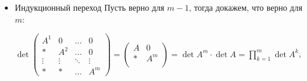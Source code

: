 \begin{enumerate}
\begin{itemize}
                    \(\det\begin{pmatrix}
                        B & 0       \\
                        * & E_{k_2} \\
                    \end{pmatrix} \underbracket{=}_{\text{5 св-во det}}
                    \det\begin{pmatrix}
                        B & 0       \\
                        0 & E_{k_2} \\
                    \end{pmatrix} \)
                    \(= f(B_1, \ldots, B_{k_1}) = f(E_1, \ldots, E_{k_1}) \det B = \det B\)

                    \(f\) --- \(k_1\)-форма, т.к. полилинейная относительно $B_j$ и антисимметричная из свойства det. (\(f\) - функция, которая для заданной \(B\) находит определитель матрицы)

                    \(f =\alpha D\), \(\alpha = f(e_1, \ldots, e_{k_1})\), \(D(B_1, \dots, B_{k_2}) = \det B\)

                    \(f(E_1, \ldots, E_{k_1}) = \det\begin{pmatrix}
                        E_{k_1} & 0       \\
                        *       & E_{k_2} \\
                    \end{pmatrix} = 1\)


                    Усложним ещё раз:

                    \(\det\begin{pmatrix}
                        B & 0 \\
                        * & C \\
                    \end{pmatrix} = g(C_1,\ldots,C_{k_2}) = g(E_1,\ldots,E_{k_2})\cdot \det C = \det B \det C\), что следует из того, что \(g\) - $k_2$ форма относительно $C_j$, при фиксированном $B$

              \item Индукционный переход
                    Пусть верно для \(m - 1\), тогда докажем, что верно для \(m\):

                    \(\det
                    \begin{pmatrix}
                        A^1    & 0      & \ldots & 0      \\
                        *      & A^2    & \ldots & 0      \\
                        \vdots & \vdots & \ddots & \vdots \\
                        *      & *      & \ldots & A^m
                    \end{pmatrix} = \begin{pmatrix}
                        A & 0   \\
                        * & A^m \\
                    \end{pmatrix} = \det A^m \cdot \det A = \prod\limits_{k=1}^m \det A^k \),


\end{itemize}
\end{enumerate}

